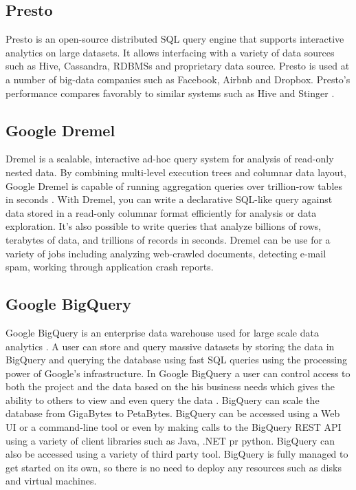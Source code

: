 \subsection{Presto}

     Presto \cite{www-presto} is an open-source distributed SQL query
     engine that supports interactive analytics on large datasets. It
     allows interfacing with a variety of data sources such as Hive,
     Cassandra, RDBMSs and proprietary data source. Presto is used at a
     number of big-data companies such as Facebook, Airbnb and
     Dropbox. Presto's performance compares favorably to similar systems
     such as Hive and Stinger \cite{presto-paper-2014}.

\subsection{Google Dremel}
 
     Dremel is a scalable, interactive ad-hoc query system for
     analysis of read-only nested data. By combining multi-level
     execution trees and columnar data layout, Google Dremel is
     capable of running aggregation queries over trillion-row tables
     in seconds \cite{paper-dremel}. With Dremel, you can write a
     declarative SQL-like query against data stored in a read-only
     columnar format efficiently for analysis or data exploration.
     It's also possible to write queries that analyze billions of
     rows, terabytes of data, and trillions of records in
     seconds. Dremel can be use for a variety of jobs including
     analyzing web-crawled documents, detecting e-mail spam, working
     through application crash reports.

\subsection{Google BigQuery}


     Google BigQuery \cite{www-bigquery} is an enterprise data
     warehouse used for large scale data
     analytics \cite{www-bigquery-documentation}. A user can store
     and query massive datasets by storing the data in BigQuery and
     querying the database using fast SQL queries using the processing
     power of Google's infrastructure. In Google BigQuery a user can
     control access to both the project and the data based on the his
     business needs which gives the ability to others to view and even
     query the data \cite{www-bigquery}. BigQuery can scale the
     database from GigaBytes to PetaBytes. BigQuery can be accessed
     using a Web UI or a command-line tool or even by making calls to
     the BigQuery REST API using a variety of client libraries such as
     Java, .NET pr python. BigQuery can also be accessed using a
     variety of third party tool. BigQuery is fully managed to get
     started on its own, so there is no need to deploy any resources
     such as disks and virtual machines.

